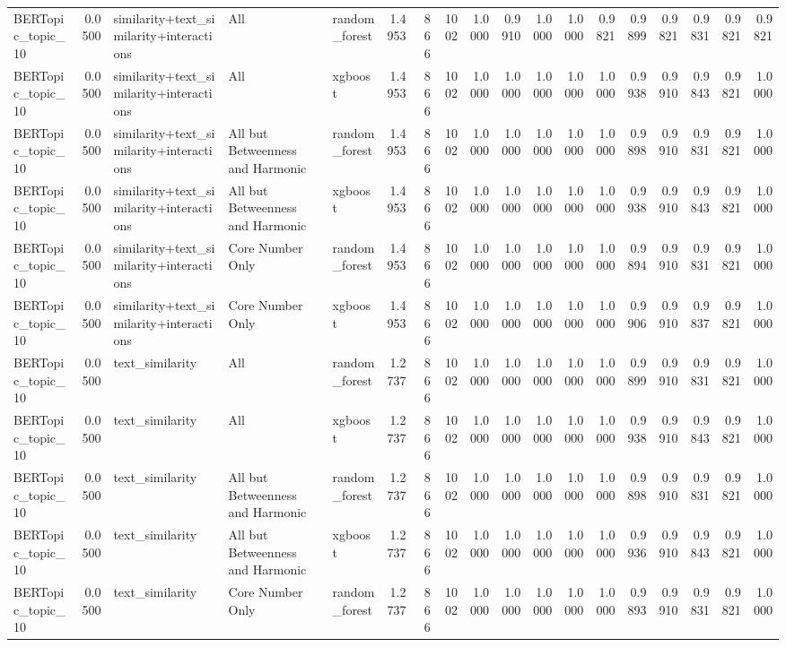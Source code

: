 \begin{tabular}{lrlllrrrrrrrrrrrrr}
BERTopic_topic_10 & 0.0500 & similarity+text_similarity+interactions & All & random_forest & 1.4953 & 866 & 1002 & 1.0000 & 0.9910 & 1.0000 & 1.0000 & 0.9821 & 0.9899 & 0.9821 & 0.9831 & 0.9821 & 0.9821 \\
BERTopic_topic_10 & 0.0500 & similarity+text_similarity+interactions & All & xgboost & 1.4953 & 866 & 1002 & 1.0000 & 1.0000 & 1.0000 & 1.0000 & 1.0000 & 0.9938 & 0.9910 & 0.9843 & 0.9821 & 1.0000 \\
BERTopic_topic_10 & 0.0500 & similarity+text_similarity+interactions & All but Betweenness and Harmonic & random_forest & 1.4953 & 866 & 1002 & 1.0000 & 1.0000 & 1.0000 & 1.0000 & 1.0000 & 0.9898 & 0.9910 & 0.9831 & 0.9821 & 1.0000 \\
BERTopic_topic_10 & 0.0500 & similarity+text_similarity+interactions & All but Betweenness and Harmonic & xgboost & 1.4953 & 866 & 1002 & 1.0000 & 1.0000 & 1.0000 & 1.0000 & 1.0000 & 0.9938 & 0.9910 & 0.9843 & 0.9821 & 1.0000 \\
BERTopic_topic_10 & 0.0500 & similarity+text_similarity+interactions & Core Number Only & random_forest & 1.4953 & 866 & 1002 & 1.0000 & 1.0000 & 1.0000 & 1.0000 & 1.0000 & 0.9894 & 0.9910 & 0.9831 & 0.9821 & 1.0000 \\
BERTopic_topic_10 & 0.0500 & similarity+text_similarity+interactions & Core Number Only & xgboost & 1.4953 & 866 & 1002 & 1.0000 & 1.0000 & 1.0000 & 1.0000 & 1.0000 & 0.9906 & 0.9910 & 0.9837 & 0.9821 & 1.0000 \\
BERTopic_topic_10 & 0.0500 & text_similarity & All & random_forest & 1.2737 & 866 & 1002 & 1.0000 & 1.0000 & 1.0000 & 1.0000 & 1.0000 & 0.9899 & 0.9910 & 0.9831 & 0.9821 & 1.0000 \\
BERTopic_topic_10 & 0.0500 & text_similarity & All & xgboost & 1.2737 & 866 & 1002 & 1.0000 & 1.0000 & 1.0000 & 1.0000 & 1.0000 & 0.9938 & 0.9910 & 0.9843 & 0.9821 & 1.0000 \\
BERTopic_topic_10 & 0.0500 & text_similarity & All but Betweenness and Harmonic & random_forest & 1.2737 & 866 & 1002 & 1.0000 & 1.0000 & 1.0000 & 1.0000 & 1.0000 & 0.9898 & 0.9910 & 0.9831 & 0.9821 & 1.0000 \\
BERTopic_topic_10 & 0.0500 & text_similarity & All but Betweenness and Harmonic & xgboost & 1.2737 & 866 & 1002 & 1.0000 & 1.0000 & 1.0000 & 1.0000 & 1.0000 & 0.9936 & 0.9910 & 0.9843 & 0.9821 & 1.0000 \\
BERTopic_topic_10 & 0.0500 & text_similarity & Core Number Only & random_forest & 1.2737 & 866 & 1002 & 1.0000 & 1.0000 & 1.0000 & 1.0000 & 1.0000 & 0.9893 & 0.9910 & 0.9831 & 0.9821 & 1.0000 \\

\end{tabular}
